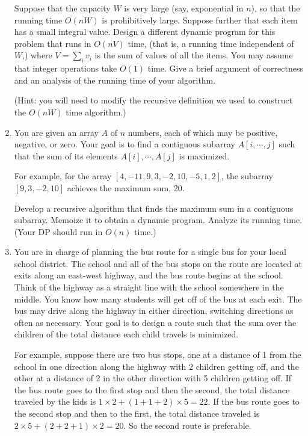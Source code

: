 \documentclass{article}
\begin{document}
\begin{enumerate}
  Suppose that the capacity $W$ is very large (say, exponential in
  $n$), so that the running time $O(nW)$ is prohibitively
  large. Suppose further that each item has a small integral
  value. Design a different dynamic program for this problem that runs
  in $O(nV)$ time, (that is, a running time independent of $W$,) where
  $V=\sum_i v_i$ is the sum of values of all the items. You may assume
  that integer operations take $O(1)$ time. Give a brief argument of
  correctness and an analysis of the running time of your algorithm.

  (Hint: you will need to modify the recursive definition we used to
  construct the $O(nW)$ time algorithm.)
  
 \item You are given an array $A$ of $n$ numbers, each of which may be positive, negative, or zero. Your goal is to find a contiguous subarray $A[i, \cdots, j]$ such that the sum of its elements $A[i], \cdots , A[j]$ is maximized.

For example, for the array $[4, -11, 9, 3, -2, 10, -5, 1, 2]$, the subarray $[9, 3, -2, 10]$ achieves the maximum sum, 20.

Develop a recursive algorithm that finds the maximum sum in a contiguous subarray. Memoize it to obtain a dynamic program. Analyze its running time. (Your DP should run in $O(n)$ time.)

\item You are in charge of planning the bus route for a single bus for your local school district. The school and all of the bus stops on the route are located at exits along an east-west highway, and the bus route begins at the school. Think of the highway as a straight line with the school somewhere in the middle. You know how many students will get off of the bus at each exit. The bus may drive along the highway in either direction, switching directions as often as necessary. Your goal is to design a route such that the sum over the children of the total distance each child travels is minimized. 

For example, suppose there are two bus stops, one at a distance of 1 from the school in one direction along the highway with 2 children getting off, and the other at a distance of 2 in the other direction with 5 children getting off. If the bus route goes to the first stop and then the second, the total distance traveled by the kids is $1 \times 2  + (1 + 1 + 2)\times 5 = 22$. If the bus route goes to the second stop and then to the first, the total distance
traveled is $2 \times 5 + (2 + 2 + 1) \times 2 = 20$. So the second route is preferable.


\end{enumerate}
\end{document}
